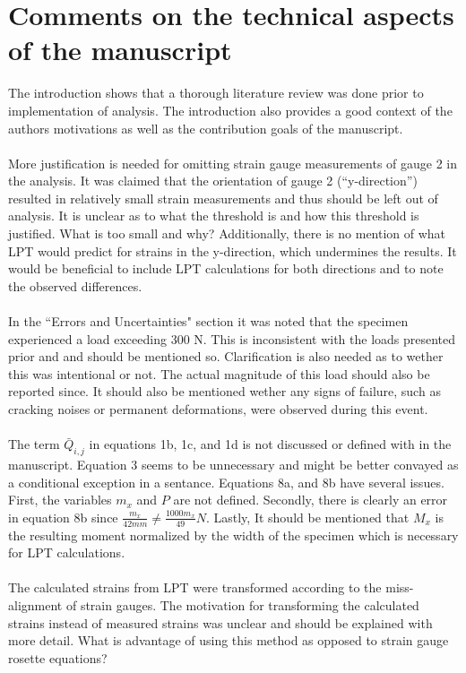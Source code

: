 \documentclass[12pt]{article}
\begin{document}
\section{Comments on the technical aspects of the manuscript}
The introduction shows that a thorough literature review was done prior to implementation of analysis. The introduction also provides a good context of the authors motivations as well as the contribution goals of the manuscript. 
 \\
 \\
More justification is needed for omitting strain gauge measurements of gauge 2 in the analysis.  It was claimed that the orientation of gauge 2 (``y-direction'') resulted in relatively small strain measurements and thus should be left out of analysis. It is unclear as to what the threshold is and how this threshold is justified. What is too small and why? Additionally, there is no mention of what LPT would predict for strains in the y-direction, which undermines the results.  It would be beneficial to  include LPT calculations for both directions and to note the observed differences.
\\
\\
In the ``Errors and Uncertainties" section it was noted that the specimen experienced a load exceeding 300 N. This is inconsistent with the loads presented prior and and should be mentioned so. Clarification is also needed as to wether this was intentional or not. The actual magnitude of this load should also be reported since. It should also be mentioned wether any signs of failure, such as cracking noises or permanent deformations, were observed during this event.
\\
\\
The term $\bar Q_{i,j}$ in equations 1b, 1c, and 1d is not discussed or defined with in the manuscript. Equation 3 seems to be unnecessary and might be better convayed as a conditional exception in a sentance. Equations 8a, and 8b have several issues. First, the variables $m_x$ and $P$ are not defined.  Secondly, there is clearly an error in equation 8b since $\frac{m_x}{42 mm} \neq \frac{1000m_x}{49}N$. Lastly, It should be mentioned that $M_x$ is the resulting moment normalized by the width of the specimen which is necessary for LPT calculations.
\\
\\
The calculated strains from LPT were transformed according to the miss-alignment of strain gauges. The motivation for transforming the calculated strains instead of measured strains was unclear and should be explained with more detail.  What is advantage of using this method as opposed to strain gauge rosette equations?
\end{document}

